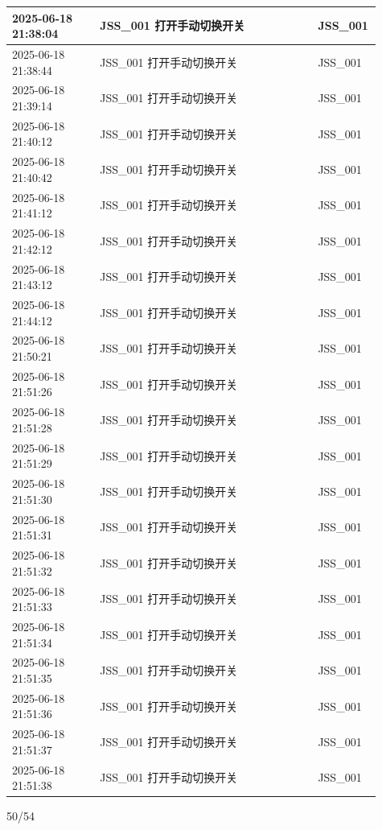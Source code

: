 \documentclass[UTF8,10pt,a4paper,fontset=fandol]{ctexart}
\begin{document}
\begin{center}
{\begin{minipage}{0.94\textheight}
\begin{tabular}{|p{0.23\linewidth}|p{0.58\linewidth}|p{0.10\linewidth}|}
\hline
2025-06-18 21:38:04 & JSS\_001 打开手动切换开关 & JSS\_001 \\
\hline
2025-06-18 21:38:44 & JSS\_001 打开手动切换开关 & JSS\_001 \\
\hline
2025-06-18 21:39:14 & JSS\_001 打开手动切换开关 & JSS\_001 \\
\hline
2025-06-18 21:40:12 & JSS\_001 打开手动切换开关 & JSS\_001 \\
\hline
2025-06-18 21:40:42 & JSS\_001 打开手动切换开关 & JSS\_001 \\
\hline
2025-06-18 21:41:12 & JSS\_001 打开手动切换开关 & JSS\_001 \\
\hline
2025-06-18 21:42:12 & JSS\_001 打开手动切换开关 & JSS\_001 \\
\hline
2025-06-18 21:43:12 & JSS\_001 打开手动切换开关 & JSS\_001 \\
\hline
2025-06-18 21:44:12 & JSS\_001 打开手动切换开关 & JSS\_001 \\
\hline
2025-06-18 21:50:21 & JSS\_001 打开手动切换开关 & JSS\_001 \\
\hline
2025-06-18 21:51:26 & JSS\_001 打开手动切换开关 & JSS\_001 \\
\hline
2025-06-18 21:51:28 & JSS\_001 打开手动切换开关 & JSS\_001 \\
\hline
2025-06-18 21:51:29 & JSS\_001 打开手动切换开关 & JSS\_001 \\
\hline
2025-06-18 21:51:30 & JSS\_001 打开手动切换开关 & JSS\_001 \\
\hline
2025-06-18 21:51:31 & JSS\_001 打开手动切换开关 & JSS\_001 \\
\hline
2025-06-18 21:51:32 & JSS\_001 打开手动切换开关 & JSS\_001 \\
\hline
2025-06-18 21:51:33 & JSS\_001 打开手动切换开关 & JSS\_001 \\
\hline
2025-06-18 21:51:34 & JSS\_001 打开手动切换开关 & JSS\_001 \\
\hline
2025-06-18 21:51:35 & JSS\_001 打开手动切换开关 & JSS\_001 \\
\hline
2025-06-18 21:51:36 & JSS\_001 打开手动切换开关 & JSS\_001 \\
\hline
2025-06-18 21:51:37 & JSS\_001 打开手动切换开关 & JSS\_001 \\
\hline
2025-06-18 21:51:38 & JSS\_001 打开手动切换开关 & JSS\_001 \\
\hline
\end{tabular}

\vfill
\hfill 50/54
\end{minipage}%
}
\end{center}
\end{document}

